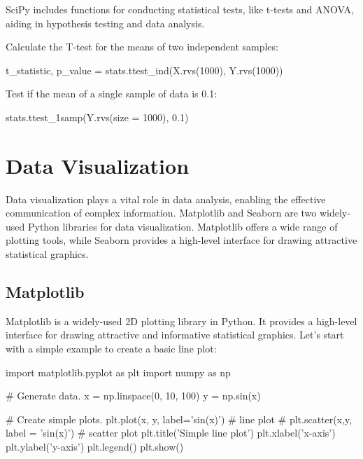 SciPy includes functions for conducting statistical tests, like t-tests and ANOVA, aiding in
hypothesis testing and data analysis.

Calculate the T-test for the means of two independent samples:
\begin{codeblock}[language=python]
    t_statistic, p_value = stats.ttest_ind(X.rvs(1000), Y.rvs(1000))
\end{codeblock}

Test if the mean of a single sample of data is 0.1:
\begin{codeblock}[language=python]
    stats.ttest_1samp(Y.rvs(size = 1000), 0.1)
\end{codeblock}








\section{Data Visualization}

Data visualization plays a vital role in data analysis, enabling the effective communication of
complex information. Matplotlib and Seaborn are two widely-used Python libraries for data
visualization. Matplotlib offers a wide range of plotting tools, while Seaborn provides a high-level
interface for drawing attractive statistical graphics.

\subsection{Matplotlib}

Matplotlib is a widely-used 2D plotting library in Python. It provides a high-level interface for
drawing attractive and informative statistical graphics. Let's start with a simple example to create a
basic line plot:

\begin{codeblock}[language=python]
    import matplotlib.pyplot as plt
    import numpy as np

    # Generate data.
    x = np.linspace(0, 10, 100)
    y = np.sin(x)

    # Create simple plots.
    plt.plot(x, y, label='sin(x)') # line plot
    # plt.scatter(x,y, label = 'sin(x)') # scatter plot
    plt.title('Simple line plot')
    plt.xlabel('x-axis')
    plt.ylabel('y-axis')
    plt.legend()
    plt.show()
\end{codeblock}

